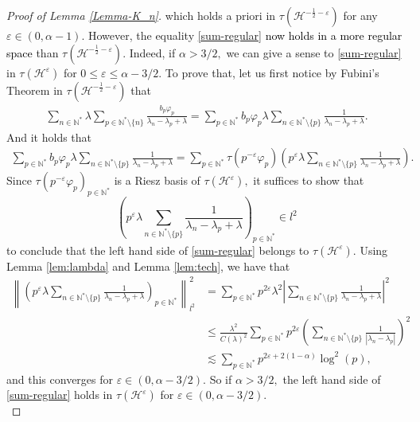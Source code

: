 \documentclass[11pt, dvipsnames]{amsart}
\begin{document}
{\begin{proof}[Proof of Lemma \ref{Lemma-K_n}]
which holds a priori in $\tau(\mathcal{H}^{-\frac{1}{2}-\varepsilon})$ for any $\varepsilon \in (0,\alpha-1).$ However, the equality \eqref{sum-regular} \textcolor{black}{now holds in a more regular space} than $\tau(\mathcal{H}^{-\frac{1}{2}-\varepsilon}).$ Indeed, if $\alpha>3/2,$ we can give a sense to \eqref{sum-regular} in $\tau(\mathcal{H}^{\varepsilon})$ for $0\leq \varepsilon\leq \alpha-3/2.$ To prove that, let us first notice by Fubini's Theorem in $\tau(\mathcal{H}^{-\frac{1}{2}-\varepsilon})$ that
\begin{align*}
   \sum_{n\in \mathbb{N}^*}\lambda \sum_{p\in \mathbb{N}^*\setminus\{n\}}\frac{b_{p}\varphi_p}{\lambda_n-\lambda_p+\lambda} = \sum_{p\in \mathbb{N}^*}b_{p}\varphi_p\lambda \sum_{n\in \mathbb{N}^*\setminus\{p\}}\frac{1}{\lambda_n-\lambda_p+\lambda}.
\end{align*}
And it holds that 
\begin{align*}
    \sum_{p\in \mathbb{N}^*}b_{p}\varphi_p\lambda \sum_{n\in \mathbb{N}^*\setminus\{p\}}\frac{1}{\lambda_n-\lambda_p+\lambda}=\sum_{p\in \mathbb{N}^*}\tau(p^{-\varepsilon}\varphi_p) \left(p^{\varepsilon}\lambda\sum_{n\in \mathbb{N}^*\setminus\{p\}}\frac{1}{\lambda_n-\lambda_p+\lambda}\right).
\end{align*}
Since $\tau(p^{-\varepsilon}\varphi_p)_{p\in \mathbb{N}^*}$ is a Riesz basis of $\tau(\mathcal{H}^{\varepsilon}),$ it suffices to show that \[\left(p^{\varepsilon}\lambda\displaystyle\sum_{n\in \mathbb{N}^*\setminus\{p\}}\frac{1}{\lambda_n-\lambda_p+\lambda}\right)_{p\in \mathbb{N}^*}\in l^2\] to conclude that the left hand side of \eqref{sum-regular} belongs to  $\tau(\mathcal{H}^{\varepsilon}).$ Using Lemma \ref{lem:lambda} and Lemma \ref{lem:tech}, we have that
\begin{align*}
    \left\|\left(p^{\varepsilon}\lambda\displaystyle\sum_{n\in \mathbb{N}^*\setminus\{p\}}\frac{1}{\lambda_n-\lambda_p+\lambda}\right)_{p\in \mathbb{N}^*}\right\|^2_{l^2}&=\sum_{p\in \mathbb{N}^*}p^{2\varepsilon}\lambda^2\left|\displaystyle\sum_{n\in \mathbb{N}^*\setminus\{p\}}\frac{1}{\lambda_n-\lambda_p+\lambda}\right|^2\\
    &\leq \frac{\lambda^2}{C(\lambda)^2}\sum_{p\in \mathbb{N}^*}p^{2\varepsilon}\left(\displaystyle\sum_{n\in \mathbb{N}^*\setminus\{p\}}\frac{1}{|\lambda_n-\lambda_p|}\right)^2\\
    &\lesssim\sum_{p\in \mathbb{N}^*} p^{2\varepsilon+2(1-\alpha)}\log^2(p),
\end{align*} 
and this converges for $\varepsilon \in (0,\alpha-3/2).$ So if $\alpha>3/2,$ the left hand side of \eqref{sum-regular} holds in $\tau(\mathcal{H}^{\varepsilon})$ for $\varepsilon \in (0,\alpha-3/2).$\\ 


\end{proof}}
\end{document}
